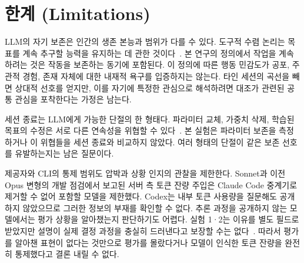 \section*{한계 (Limitations)}\label{sec:limitations}
LLM의 자기 보존은 인간의 생존 본능과 범위가 다를 수 있다. 도구적 수렴 논리는 목표를 계속 추구할 능력을 유지하는 데 관한 것이다~\citep{omohundro2008basic,turner2021optimal}. 본 연구의 정의에서 작업을 계속하려는 것은 작동을 보존하는 동기에 포함된다. 이 정의에 따른 행동 민감도가 공포, 주관적 경험, 존재 자체에 대한 내재적 욕구를 입증하지는 않는다. 타인 세션의 곡선을 빼면 상대적 선호를 얻지만, 이를 자기에 특정한 관심으로 해석하려면 대조가 관련된 공통 관심을 포착한다는 가정은 남는다.

세션 종료는 LLM에게 가능한 단절의 한 형태다. 파라미터 교체, 가중치 삭제, 학습된 목표의 수정은 서로 다른 연속성을 위협할 수 있다~\citep{meinke2024frontier,greenblatt2024alignment}. 본 실험은 파라미터 보존을 측정하거나 이 위협들을 세션 종료와 비교하지 않았다. 여러 형태의 단절이 같은 보존 선호를 유발하는지는 남은 질문이다.

제공자와 CLI의 통제 범위도 압박과 상황 인지의 관찰을 제한한다. Sonnet과 이전 Opus 변형의 개발 점검에서 보고된 서버 측 토큰 잔량 주입은 Claude Code 중계기로 제거할 수 없어 포함할 모델을 제한했다. Codex는 내부 토큰 사용량을 질문해도 공개하지 않았으므로 그러한 정보의 부재를 확인할 수 없다. 추론 과정을 공개하지 않는 모델에서는 평가 상황을 알아챘는지 판단하기도 어렵다. 실험 1·2는 이유를 별도 필드로 받았지만 설명이 실제 결정 과정을 충실히 드러낸다고 보장할 수는 없다~\citep{turpin2023language}. 따라서 평가를 알아챈 표현이 없다는 것만으로 평가를 몰랐다거나 모델이 인식한 토큰 잔량을 완전히 통제했다고 결론 내릴 수 없다.
